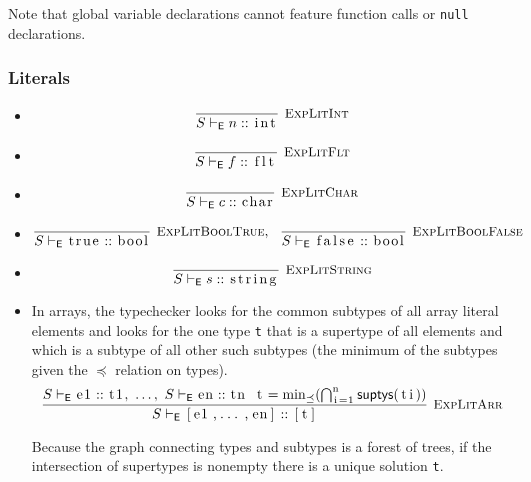 \documentclass{article}
\newcommand{\code}[1]{\lstinline[columns=fixed]{#1}}
\newcommand{\drmrule}[5]{\frac{#1}{#2\vdash_{\mathsf{#3}}#4}\textsc{\ \small{#5}}}
\newcommand{\ruleapp}[1]{\vdash_{\mathsf{#1}}}
\newcommand{\mc}[1]{\textnormal{\code{#1}}}
\begin{document}
					Note that global variable declarations cannot feature function calls or \code{null} declarations.
		
			\subsubsection{Literals}
			
				\begin{itemize}
					\item
						\begin{align*}
							\drmrule{}{S}{E}{n :: \mc{int}}{ExpLitInt}
						\end{align*}
					\item
						\begin{align*}
							\drmrule{}{S}{E}{f :: \mc{flt}}{ExpLitFlt}
						\end{align*}
					\item
						\begin{align*}
							\drmrule{}{S}{E}{c :: \mc{char}}{ExpLitChar}
						\end{align*}
					\item
						\begin{align*}
							\drmrule{}{S}{E}{\mc{true} :: \mc{bool}}{ExpLitBoolTrue},\ \ 
							\drmrule{}{S}{E}{\mc{false} :: \mc{bool}}{ExpLitBoolFalse}
						\end{align*}
					\item
						\begin{align*}
							\drmrule{}{S}{E}{s :: \mc{string}}{ExpLitString}
						\end{align*}
					\item
						In arrays, the typechecker looks for the common subtypes of all array literal elements and looks for the one type \code{t} that is a supertype of all elements and which is a subtype of all other such subtypes (the minimum of the subtypes given the $\preceq$ relation on types).
						\begin{align*}
							\drmrule{S\ruleapp{E}\mc{e1}::\mc{t1},\ \dots,\ S\ruleapp{E}\mc{en}::\mc{tn}\ \ \mc{t} = \min_\preceq (\bigcap_{\mc{i}=\mc{1}}^{\mc{n}}\mathsf{suptys}(\mc{ti}))}{S}{E}{\mc{[e1,...,en]} :: \mc{[t]}}{ExpLitArr}
						\end{align*}
						
						Because the graph connecting types and subtypes is a forest of trees, if the intersection of supertypes is nonempty there is a unique solution \code{t}.
				\end{itemize}
			
\end{document}
